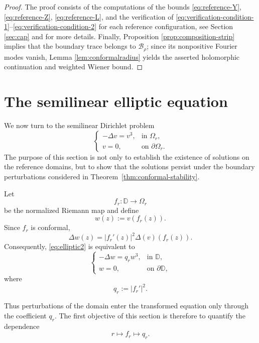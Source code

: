 \documentclass[11pt,a4paper]{amsart}
\begin{document}
\begin{proof}
	The proof consists of the computations of the bounds
	\eqref{eq:reference-Y},
	\eqref{eq:reference-Z},
	\eqref{eq:reference-L},
	and the verification of
	\eqref{eq:verification-condition-1}--\eqref{eq:verification-condition-2}
	for each reference configuration, see Section \ref{sec:cap} and \cite{program} for more details.
	Finally, Proposition \ref{prop:composition-strip} implies that the boundary trace belongs to \(\mathcal B_\rho\); since its nonpositive Fourier modes vanish, Lemma \ref{lem:conformalradius} yields the asserted holomorphic continuation and weighted Wiener bound.
\end{proof}

\section{The semilinear elliptic equation}
\label{sec:elliptic}

We now turn to the semilinear Dirichlet problem
\begin{equation}\label{eq:elliptic2}
	\begin{cases}
		-\Delta v=v^3,&\text{in }\Omega_r,\\
		v=0,&\text{on }\partial\Omega_r.
	\end{cases}
\end{equation}
The purpose of this section is not only to establish the existence of solutions on the
reference domains, but to show that the solutions persist under the
boundary perturbations considered in Theorem~\ref{thm:conformal-stability}.

Let
\[
f_r:\mathbb D\longrightarrow\Omega_r
\]
be the normalized Riemann map and define
\[
w(z):=v(f_r(z)).
\]
Since $f_r$ is conformal,
\[
\Delta w(z)=|f_r'(z)|^2\Delta(v)(f_r(z)).
\]
Consequently, \eqref{eq:elliptic2} is equivalent to
\begin{equation}\label{eq:elliptic-disk}
	\begin{cases}
		-\Delta w=q_r w^3,&\text{in }\mathbb D,\\
		w=0,&\text{on }\partial\mathbb D,
	\end{cases}
\end{equation}
where
\begin{equation}\label{eq:qr}
	q_r:=|f_r'|^2.
\end{equation}

Thus perturbations of the domain enter the transformed equation only
through the coefficient $q_r$. The first objective of this section is
therefore to quantify the dependence
\[
r\longmapsto f_r\longmapsto q_r.
\]
\end{document}
